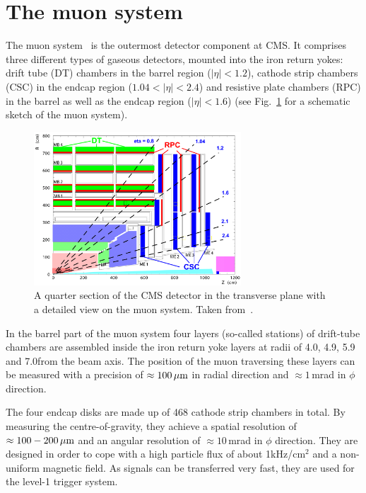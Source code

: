 \section{The muon system}
\label{sec:MuonSystem}
The muon system~\cite{bib:CMS:TDR_2006,bib:CMS:TDR_MuonSystem} is the outermost detector component at CMS.
It comprises three different types of gaseous detectors, mounted into the iron return yokes: drift tube (DT) chambers in the barrel region ($|\eta|<1.2$), cathode strip chambers (CSC) in the endcap region ($1.04<|\eta|<2.4$) and resistive plate chambers (RPC) in the barrel as well as the endcap region ($|\eta|<1.6$) (see Fig.~\ref{fig:MuonSystem} for a schematic sketch of the muon system).
\begin{figure}[!b]
  \centering
      \includegraphics[width=0.69\textwidth]{figures/experiment/CMS/Figures_Experimental_Apparatus_MuonDetector.png}
  \caption{A quarter section of the CMS detector in the transverse plane with a detailed view on the muon system. Taken from~\cite{bib:CMS:TDR_2006}.}  
  \label{fig:MuonSystem}
\end{figure}
In the barrel part of the muon system four layers (so-called stations) of drift-tube chambers are assembled inside the iron return yoke layers at radii of 4.0, 4.9, 5.9 and 7.0\m from the beam axis.
The position of the muon traversing these layers can be measured with a precision of $\approx 100\,\mu\text{m}$ in radial direction and $\approx 1\,$mrad in $\phi$ direction. 

The four endcap disks are made up of 468 cathode strip chambers in total.
By measuring the centre-of-gravity, they achieve a spatial resolution of $\approx 100-200\,\mu\text{m}$ and an angular resolution of $\approx 10\,$mrad in $\phi$ direction.
They are designed in order to cope with a high particle flux of about 1kHz/cm$^2$ and a non-uniform magnetic field.
As signals can be transferred very fast, they are used for the level-1 trigger system.

